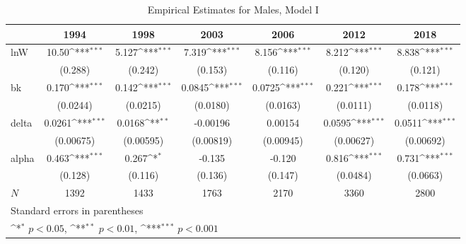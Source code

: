 \documentclass[12pt,a4paper]{article}
\begin{document}
\begin{table}[h!]\centering
	\def\sym#1{\ifmmode^{#1}\else\(^{#1}\)\fi}
	\caption{Empirical Estimates for Males, Model I}
	\begin{tabular}{l*{6}{c}}
		\hline\hline
		&\multicolumn{1}{c}{1994}&\multicolumn{1}{c}{1998}&\multicolumn{1}{c}{2003}&\multicolumn{1}{c}{2006}&\multicolumn{1}{c}{2012}&\multicolumn{1}{c}{2018}\\
		\hline
		lnW      &       10.50\sym{***}&       5.127\sym{***}&       7.319\sym{***}&       8.156\sym{***}&       8.212\sym{***}&       8.838\sym{***}\\
		&     (0.288)         &     (0.242)         &     (0.153)         &     (0.116)         &     (0.120)         &     (0.121)         \\
		\hline
		bk       &       0.170\sym{***}&       0.142\sym{***}&      0.0845\sym{***}&      0.0725\sym{***}&       0.221\sym{***}&       0.178\sym{***}\\
		&    (0.0244)         &    (0.0215)         &    (0.0180)         &    (0.0163)         &    (0.0111)         &    (0.0118)         \\
		\hline
		delta      &      0.0261\sym{***}&      0.0168\sym{**} &    -0.00196         &     0.00154         &      0.0595\sym{***}&      0.0511\sym{***}\\
		&   (0.00675)         &   (0.00595)         &   (0.00819)         &   (0.00945)         &   (0.00627)         &   (0.00692)         \\
		\hline
		alpha       &       0.463\sym{***}&       0.267\sym{*}  &      -0.135         &      -0.120         &       0.816\sym{***}&       0.731\sym{***}\\
		&     (0.128)         &     (0.116)         &     (0.136)         &     (0.147)         &    (0.0484)         &    (0.0663)         \\
		\hline
		\(N\)       &        1392         &        1433         &        1763         &        2170         &        3360         &        2800         \\
		\hline\hline
		\multicolumn{7}{l}{\footnotesize Standard errors in parentheses}\\
		\multicolumn{7}{l}{\footnotesize \sym{*} \(p<0.05\), \sym{**} \(p<0.01\), \sym{***} \(p<0.001\)}\\
	\end{tabular}
\end{table}
\end{document}
